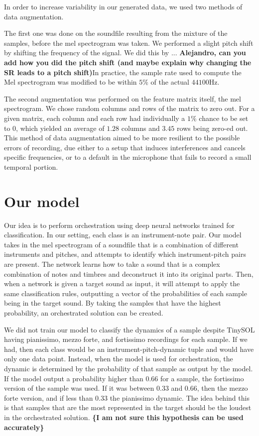 \documentclass{article}
\begin{document}
In order to increase variability in our generated data, we used two methods of data augmentation.

The first one was done on the soundfile resulting from the mixture of the samples, before the mel spectrogram was taken. We performed a slight pitch shift by shifting the frequency of the signal. We did this by ... \textbf{Alejandro, can you add how you did the pitch shift (and maybe explain why changing the SR leads to a pitch shift)}In practice, the sample rate used to compute the Mel spectrogram was modified to be within $5\%$ of the actual $44100$Hz.

The second augmentation was performed on the feature matrix itself, the mel spectrogram. We chose random columns and rows of the matrix to zero out. For a given matrix, each column and each row had individually a $1\%$ chance to be set to 0, which yielded an average of $1.28$  columns and $3.45$ rows being zero-ed out. This method of data augmentation aimed to be more resilient to the possible errors of recording, due either to a setup that induces interferences and cancels specific frequencies, or to a default in the microphone that fails to record a small temporal portion.

\section{Our model}

Our idea is to perform orchestration using deep neural networks trained for classification. In our setting, each class is an instrument-note pair. Our model takes in the mel spectrogram of a soundfile that is a combination of different instruments and pitches, and attempts to identify which instrument-pitch pairs are present. The network learns how to take a sound that is a complex combination of notes and timbres and deconstruct it into its original parts. Then, when a network is given a target sound as input, it will attempt to apply the same classification rules, outputting a vector of the probabilities of each sample being in the target sound. By taking the samples that have the highest probability, an orchestrated solution can be created. 

We did not train our model to classify the dynamics of a sample despite TinySOL having pianissimo, mezzo forte, and fortissimo recordings for each sample. If we had, then each class would be an instrument-pitch-dynamic tuple and would have only one data point. Instead, when the model is used for orchestration, the dynamic is determined by the probability of that sample as output by the model. If the model output a probability higher than $0.66$ for a sample, the fortissimo version of the sample was used. If it was between $0.33$ and $0.66$, then the mezzo forte version, and if less than $0.33$ the pianissimo dynamic. The idea behind this is that samples that are the most represented in the target should be the loudest in the orchestrated solution. \textbf{\{I am not sure this hypothesis can be used accurately\}}
\end{document}
